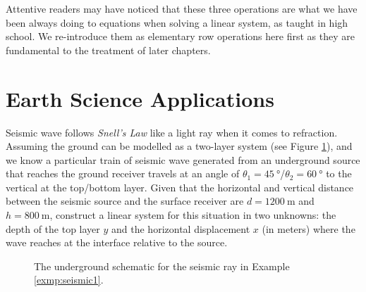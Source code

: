 Attentive readers may have noticed that these three operations are what we have been always doing to equations when solving a linear system, as taught in high school. We re-introduce them as elementary row operations here first as they are fundamental to the treatment of later chapters.

\section{Earth Science Applications}
\label{section:ch1earth}
\begin{exmp}
\label{exmp:seismic1}
Seismic wave follows \textit{Snell's Law} like a light ray when it comes to refraction. Assuming the ground can be modelled as a two-layer system (see Figure \ref{fig:seismic1}), and we know a particular train of seismic wave generated from an underground source that reaches the ground receiver travels at an angle of $\theta_1 = \SI{45}{\degree}$/$\theta_2 = \SI{60}{\degree}$ to the vertical at the top/bottom layer. Given that the horizontal and vertical distance between the seismic source and the surface receiver are $d = \SI{1200}{\m}$ and $h = \SI{800}{\m}$, construct a linear system for this situation in two unknowns: the depth of the top layer $y$ and the horizontal displacement $x$ (in meters) where the wave reaches at the interface relative to the source.
\end{exmp}
\begin{figure}
\centering
{}
\caption{The underground schematic for the seismic ray in Example \ref{exmp:seismic1}.}
\label{fig:seismic1}
\end{figure}
